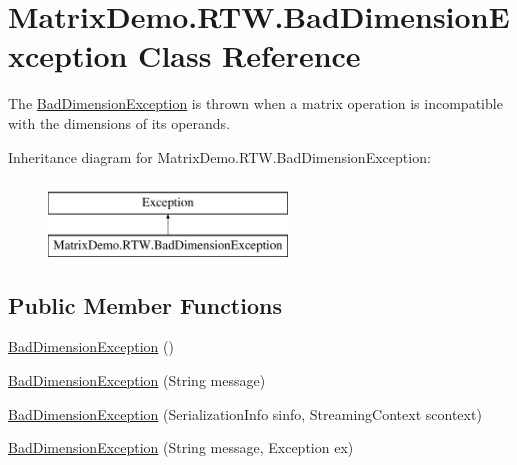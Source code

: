 \hypertarget{class_matrix_demo_1_1_r_t_w_1_1_bad_dimension_exception}{}\section{Matrix\+Demo.\+R\+T\+W.\+Bad\+Dimension\+Exception Class Reference}
\label{class_matrix_demo_1_1_r_t_w_1_1_bad_dimension_exception}


The \mbox{\hyperlink{class_matrix_demo_1_1_r_t_w_1_1_bad_dimension_exception}{Bad\+Dimension\+Exception}} is thrown when a matrix operation is incompatible with the dimensions of its operands.  


Inheritance diagram for Matrix\+Demo.\+R\+T\+W.\+Bad\+Dimension\+Exception\+:\begin{figure}[H]
\begin{center}
\leavevmode
\includegraphics[height=2.000000cm]{class_matrix_demo_1_1_r_t_w_1_1_bad_dimension_exception}
\end{center}
\end{figure}
\subsection*{Public Member Functions}
\begin{DoxyCompactItemize}
\item 
\mbox{\hyperlink{class_matrix_demo_1_1_r_t_w_1_1_bad_dimension_exception_a798ed5eabe99eb0da328d483fc65b872}{Bad\+Dimension\+Exception}} ()
\item 
\mbox{\hyperlink{class_matrix_demo_1_1_r_t_w_1_1_bad_dimension_exception_acb08f6b3204a52bab02d4a2b2bd5018d}{Bad\+Dimension\+Exception}} (String message)
\item 
\mbox{\hyperlink{class_matrix_demo_1_1_r_t_w_1_1_bad_dimension_exception_ac8b77428bbfa83daf5d72873c5ea2cfa}{Bad\+Dimension\+Exception}} (Serialization\+Info sinfo, Streaming\+Context scontext)
\item 
\mbox{\hyperlink{class_matrix_demo_1_1_r_t_w_1_1_bad_dimension_exception_a7cbc7dfbc98f0834b5954db4e41a5c10}{Bad\+Dimension\+Exception}} (String message, Exception ex)
\end{DoxyCompactItemize}


